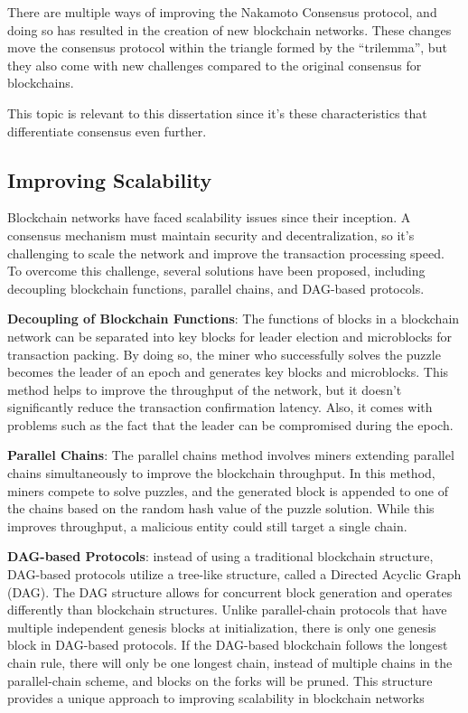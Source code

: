 There are multiple ways of improving the Nakamoto Consensus protocol, and doing so has resulted in the creation of new blockchain networks. These changes move the consensus protocol within the triangle formed by the ``trilemma'', but they also come with new challenges compared to the original consensus for blockchains.

This topic is relevant to this dissertation since it's these characteristics that differentiate consensus even further.

\subsection*{Improving Scalability}
Blockchain networks have faced scalability issues since their inception. A consensus mechanism must maintain security and decentralization, so it's challenging to scale the network and improve the transaction processing speed. To overcome this challenge, several solutions have been proposed, including decoupling blockchain functions, parallel chains, and DAG-based protocols.

\textbf{Decoupling of Blockchain Functions}: The functions of blocks in a blockchain network can be separated into key blocks for leader election and microblocks for transaction packing. By doing so, the miner who successfully solves the puzzle becomes the leader of an epoch and generates key blocks and microblocks. This method helps to improve the throughput of the network, but it doesn't significantly reduce the transaction confirmation latency. Also, it comes with problems such as the fact that the leader can be compromised during the epoch.

\textbf{Parallel Chains}: The parallel chains method involves miners extending parallel chains simultaneously to improve the blockchain throughput. In this method, miners compete to solve puzzles, and the generated block is appended to one of the chains based on the random hash value of the puzzle solution. While this improves throughput, a malicious entity could still target a single chain.

\textbf{DAG-based Protocols}: instead of using a traditional blockchain structure, DAG-based protocols utilize a tree-like structure, called a Directed Acyclic Graph (DAG). The DAG structure allows for concurrent block generation and operates differently than blockchain structures. Unlike parallel-chain protocols that have multiple independent genesis blocks at initialization, there is only one genesis block in DAG-based protocols. If the DAG-based block\-chain follows the longest chain rule, there will only be one longest chain, instead of multiple chains in the parallel-chain scheme, and blocks on the forks will be pruned. This structure provides a unique approach to improving scalability in blockchain networks 

